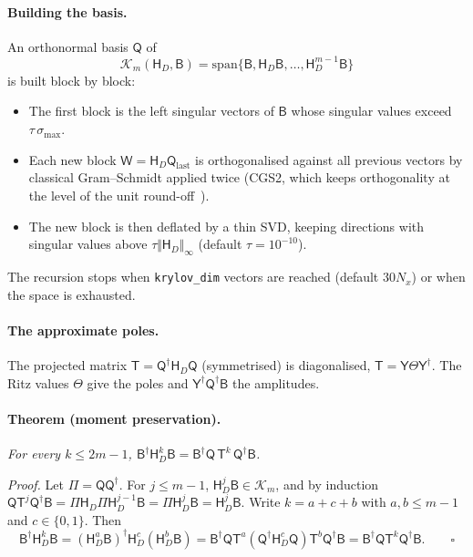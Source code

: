 \documentclass[11pt,a4paper]{article}
\newcommand{\code}[1]{\texttt{#1}}
\newcommand{\mat}[1]{\mathsf{#1}}
\newcommand{\Nx}{N_x}
\begin{document}
\paragraph{Building the basis.} An orthonormal basis $\mat Q$ of
\begin{equation}
\mathcal K_m(\mat H_D,\mat B) = \mathrm{span}\{\mat B,\mat H_D\mat B,\dots,\mat H_D^{m-1}\mat B\}
\end{equation}
is built block by block:
\begin{itemize}
\item The first block is the left singular vectors of $\mat B$ whose singular values exceed $\tau\,\sigma_\text{max}$.
\item Each new block $\mat W = \mat H_D\mat Q_\text{last}$ is orthogonalised against all previous vectors by classical Gram--Schmidt applied twice (CGS2, which keeps orthogonality at the level of the unit round-off~\cite{giraud2005}).
\item The new block is then deflated by a thin SVD, keeping directions with singular values above $\tau\Vert\mat H_D\Vert_\infty$ (default $\tau=10^{-10}$).
\end{itemize}
The recursion stops when \code{krylov\_dim} vectors are reached (default $30\Nx$) or when the space is exhausted.

\paragraph{The approximate poles.} The projected matrix $\mat T = \mat Q^\dagger\mat H_D\mat Q$ (symmetrised) is diagonalised, $\mat T = \mat Y\Theta\mat Y^\dagger$. The Ritz values $\Theta$ give the poles and $\mat Y^\dagger\mat Q^\dagger\mat B$ the amplitudes.

\paragraph{Theorem (moment preservation).} \emph{For every $k\le 2m-1$, $\mat B^\dagger\mat H_D^k\mat B = \mat B^\dagger\mat Q\,\mat T^k\,\mat Q^\dagger\mat B$.}

\emph{Proof.} Let $\Pi=\mat Q\mat Q^\dagger$. For $j\le m-1$, $\mat H_D^j\mat B\in\mathcal K_m$, and by induction $\mat Q\mat T^j\mat Q^\dagger\mat B = \Pi\mat H_D\Pi\mat H_D^{j-1}\mat B = \Pi\mat H_D^j\mat B = \mat H_D^j\mat B$. Write $k=a+c+b$ with $a,b\le m-1$ and $c\in\{0,1\}$. Then
\[
\mat B^\dagger\mat H_D^k\mat B = (\mat H_D^a\mat B)^\dagger\mat H_D^c(\mat H_D^b\mat B) = \mat B^\dagger\mat Q\mat T^a(\mat Q^\dagger\mat H_D^c\mat Q)\mat T^b\mat Q^\dagger\mat B = \mat B^\dagger\mat Q\mat T^k\mat Q^\dagger\mat B. \qquad\square
\]
\end{document}
